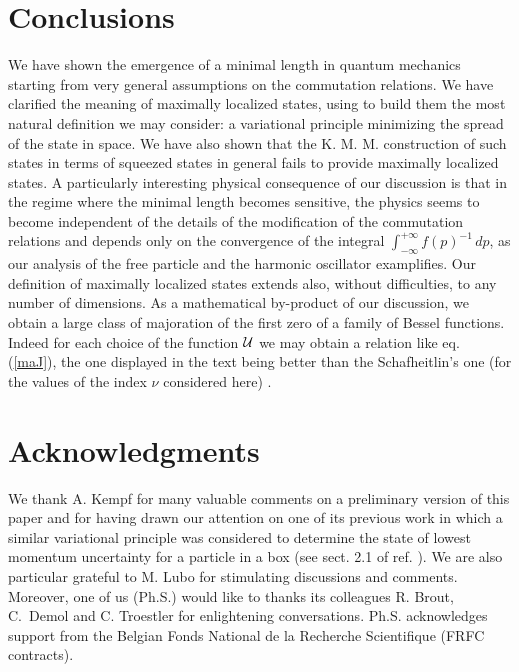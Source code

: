 \documentclass[a4paper,10pt]{article}
\newcommand{\cU}{{\cal U}}
\newcommand{\KMM}{K. M. M. }
\begin{document}
\section{Conclusions}
We have shown the emergence of a minimal length in quantum
mechanics starting from very general assumptions on the
commutation relations. We have clarified the meaning of maximally
localized states, using to build them the most natural definition
we may consider: a variational principle minimizing the spread of
the state in space. We have also shown that the \KMM construction
of such states in terms of squeezed states in general fails to
provide maximally localized states. A particularly interesting
physical consequence of our discussion is that in the regime where
the minimal length becomes sensitive, the physics seems to become
independent of the details of the modification of the commutation
relations and depends only on the convergence of the integral
$\int_{-\infty}^{+\infty}f(p)^{-1}\,dp$, as our analysis of the
free particle and the harmonic oscillator examplifies. Our
definition of maximally localized states extends also, without
difficulties, to any number of dimensions. As a mathematical
by-product of our discussion, we obtain a large class of
majoration of the first zero of a family of Bessel functions.
Indeed for each choice of the function $\cU$ we may obtain a
relation like eq. (\ref{maJ}), the one displayed in the text being
better than the Schafheitlin's one (for the values of the index
$\nu$ considered here) \cite{Wa}.
\section{Acknowledgments}
We thank A. Kempf for many valuable comments on a preliminary
version of this paper and for having drawn our attention on one of
its previous work in which a similar variational principle was
considered to determine the state of lowest momentum uncertainty
for a particle in a box (see sect. 2.1 of ref. \cite{K6}). We are
also particular grateful to M. Lubo for stimulating discussions
and comments. Moreover, one of us (Ph.S.) would like to thanks its
colleagues R. Brout, C.~Demol and C. Troestler for enlightening
conversations. Ph.S. acknowledges support from the Belgian Fonds
National de la Recherche Scientifique (FRFC contracts).
\appendix
\end{document}
